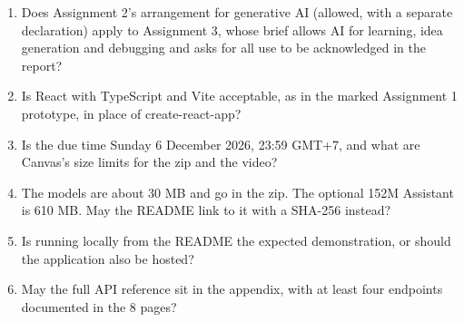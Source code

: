 \begin{enumerate}
  \item Does Assignment 2's arrangement for generative AI (allowed, with a separate declaration)
    apply to Assignment 3, whose brief allows AI for learning, idea generation and debugging and
    asks for all use to be acknowledged in the report?
  \item Is React with TypeScript and Vite acceptable, as in the marked Assignment 1 prototype, in
    place of create-react-app?
  \item Is the due time Sunday 6 December 2026, 23:59 GMT+7, and what are Canvas's size limits
    for the zip and the video?
  \item The models are about 30 MB and go in the zip. The optional 152M Assistant is 610 MB. May
    the README link to it with a SHA-256 instead?
  \item Is running locally from the README the expected demonstration, or should the application
    also be hosted?
  \item May the full API reference sit in the appendix, with at least four endpoints documented
    in the 8 pages?
\end{enumerate}
